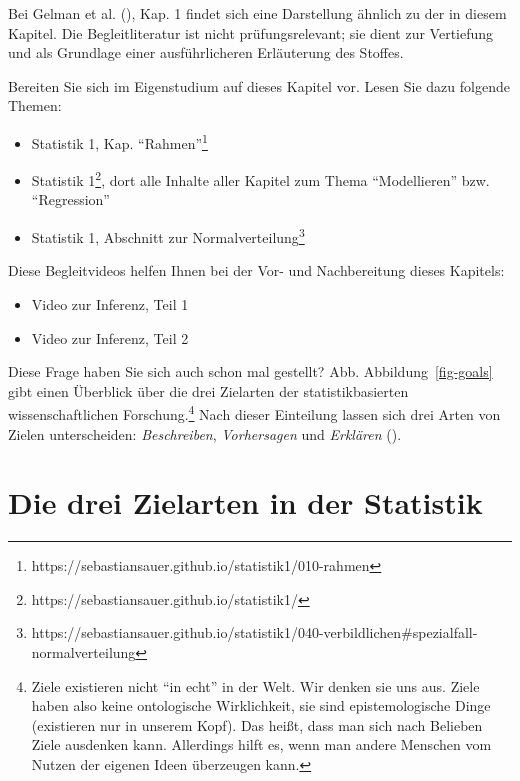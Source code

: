 \documentclass[
  ngerman,
  letterpaper,
  twoside,
  open=any]{scrbook}
\providecommand{\tightlist}{%
  \setlength{\itemsep}{0pt}\setlength{\parskip}{0pt}}\usepackage{longtable,booktabs,array}
\theoremstyle{definition}
\theoremstyle{plain}
\theoremstyle{definition}
\theoremstyle{definition}
\theoremstyle{definition}
\theoremstyle{definition}
\theoremstyle{remark}
\begin{document}
Bei Gelman et al. (), Kap. 1 findet sich
eine Darstellung ähnlich zu der in diesem Kapitel. Die Begleitliteratur
ist nicht prüfungsrelevant; sie dient zur Vertiefung und als Grundlage
einer ausführlicheren Erläuterung des Stoffes.

Bereiten Sie sich im Eigenstudium auf dieses Kapitel vor. Lesen Sie dazu
folgende Themen:

\begin{itemize}
\tightlist
\item
  Statistik 1, Kap. \enquote{Rahmen}\footnote{https://sebastiansauer.github.io/statistik1/010-rahmen}
\item
  Statistik 1\footnote{https://sebastiansauer.github.io/statistik1/},
  dort alle Inhalte aller Kapitel zum Thema \enquote{Modellieren} bzw.
  \enquote{Regression}
\item
  Statistik 1, Abschnitt zur Normalverteilung\footnote{https://sebastiansauer.github.io/statistik1/040-verbildlichen\#spezialfall-normalverteilung}
\end{itemize}

Diese Begleitvideos helfen Ihnen bei der Vor- und Nachbereitung dieses
Kapitels:

\begin{itemize}
\tightlist
\item
  Video zur Inferenz, Teil 1
\item
  Video zur Inferenz, Teil 2
\end{itemize}

Diese Frage haben Sie sich auch schon mal gestellt? Abb.
Abbildung~\ref{fig-goals} gibt einen Überblick über die drei Zielarten
der statistikbasierten wissenschaftlichen Forschung.\footnote{Ziele
  existieren nicht \enquote{in echt} in der Welt. Wir denken sie uns
  aus. Ziele haben also keine ontologische Wirklichkeit, sie sind
  epistemologische Dinge (existieren nur in unserem Kopf). Das heißt,
  dass man sich nach Belieben Ziele ausdenken kann. Allerdings hilft es,
  wenn man andere Menschen vom Nutzen der eigenen Ideen überzeugen kann.}
Nach dieser Einteilung lassen sich drei Arten von Zielen unterscheiden:
\emph{Beschreiben}, \emph{Vorhersagen} und \emph{Erklären}
().

\section{Die drei Zielarten in der
Statistik}\label{die-drei-zielarten-in-der-statistik}
\end{document}
